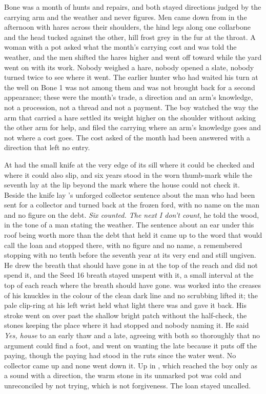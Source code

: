 Bone was a month of hunts and repairs, and both stayed directions judged by the carrying arm and the weather and never figures. Men came down from  in the afternoon with hares across their shoulders, the hind legs along one collarbone and the head tucked against the other, hill frost grey in the fur at the throat. A woman with a pot asked what the month's carrying cost and was told the weather, and the men shifted the hares higher and went off toward  while the yard went on with its work. Nobody weighed a hare, nobody opened a slate, nobody turned twice to see where it went. The earlier hunter who had waited his turn at the well on Bone 1 was not among them and was not brought back for a second appearance; these were the month's trade, a direction and an arm's knowledge, not a procession, not a thread and not a payment. The boy watched the way the arm that carried a hare settled its weight higher on the shoulder without asking the other arm for help, and filed the carrying where an arm's knowledge goes and not where a cost goes. The cost asked of the month had been answered with a direction that left no entry.

\scenebreak

At   had the small knife at the very edge of its sill where it could be checked and where it could also slip, and six years stood in the worn thumb-mark while the seventh lay at the lip beyond the mark where the house could not check it. Beside the knife lay 's unforged collector sentence about the man who had been sent for a collector and turned back at the frozen ford, with no name on the man and no figure on the debt. \emph{Six counted. The next I don't count}, he told the wood, in the tone of a man stating the weather. The sentence about an ear under this roof being worth more than the debt that held it came up to the word that would call the loan and stopped there, with no figure and no name, a remembered stopping with no tenth before the seventh year at its very end and still ungiven. He drew the breath that should have gone in at the top of the reach and did not spend it, and the Seed 16 breath stayed unspent with it, a small interval at the top of each reach where the breath should have gone.  was worked into the creases of his knuckles in the colour of the clean dark line and no scrubbing lifted it; the pale clip-ring at his left wrist held what light there was and gave it back. His stroke went on over  past the shallow bright patch without the half-check, the stones keeping the place where it had stopped and nobody naming it. He said \emph{Yes, house} to an early thaw and a late, agreeing with both so thoroughly that no argument could find a foot, and went on wanting the late because it puts off the paying, though the paying had stood in the ruts since the water went. No collector came up  and none went down it. Up in , which reached the boy only as a sound with a direction, the warm stone in its unmarked pot was cold and unreconciled by not trying, which is not forgiveness. The loan stayed uncalled.

